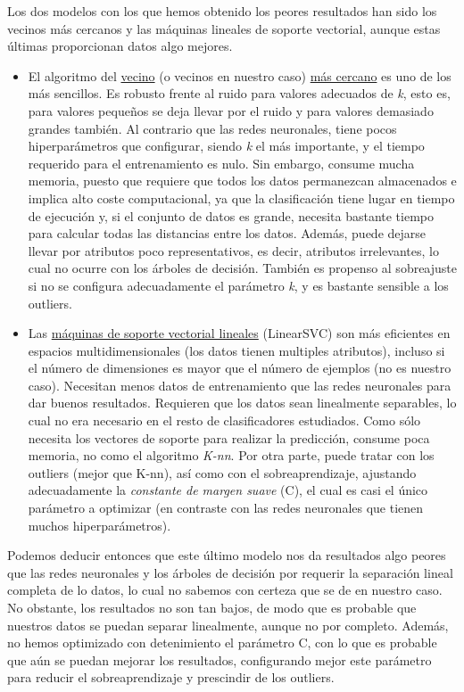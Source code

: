 \documentclass[a4paper,11pt]{article}
\begin{document}
Los dos modelos con los que hemos obtenido los peores resultados han sido los vecinos más cercanos y las máquinas lineales de soporte vectorial, aunque estas últimas proporcionan datos algo mejores.

\begin{itemize}
	\item El algoritmo del \underline{vecino} (o vecinos en nuestro caso) \underline{más cercano} es uno de los más sencillos. Es robusto frente al ruido para valores adecuados de \textit{k}, esto es, para valores pequeños se deja llevar por el ruido y para valores demasiado grandes también. Al contrario que las redes neuronales, tiene pocos hiperparámetros que configurar, siendo \textit{k} el más importante, y el tiempo requerido para el entrenamiento es nulo. Sin embargo, consume mucha memoria, puesto que requiere que todos los datos permanezcan almacenados e implica alto coste computacional, ya que la clasificación tiene lugar en tiempo de ejecución y, si el conjunto de datos es grande, necesita bastante tiempo para calcular todas las distancias entre los datos. Además, puede dejarse llevar por atributos poco representativos, es decir, atributos irrelevantes, lo cual no ocurre con los árboles de decisión. También es propenso al sobreajuste si no se configura adecuadamente el parámetro \textit{k}, y es bastante sensible a los outliers.  

	\item Las \underline{máquinas de soporte vectorial lineales} (LinearSVC) son más eficientes en espacios multidimensionales (los datos tienen multiples atributos), incluso si el número de dimensiones es mayor que el número de ejemplos (no es nuestro caso). Necesitan menos datos de entrenamiento que las redes neuronales para dar buenos resultados. Requieren que los datos sean linealmente separables, lo cual no era necesario en el resto de clasificadores estudiados. Como sólo necesita los vectores de soporte para realizar la predicción, consume poca memoria, no como el algoritmo \textit{K-nn}. Por otra parte, puede tratar con los outliers (mejor que K-nn), así como con el sobreaprendizaje, ajustando adecuadamente la \textit{constante de margen suave} (C), el cual es casi el único parámetro a optimizar (en contraste con las redes neuronales que tienen muchos hiperparámetros).
\end{itemize}

Podemos deducir entonces que este último modelo nos da resultados algo peores que las redes neuronales y los árboles de decisión por requerir la separación lineal completa de lo datos, lo cual no sabemos con certeza que se de en nuestro caso. No obstante, los resultados no son tan bajos, de modo que es probable que nuestros datos se puedan separar linealmente, aunque no por completo. Además, no hemos optimizado con detenimiento el parámetro C, con lo que es probable que aún se puedan mejorar los resultados, configurando mejor este parámetro para reducir el sobreaprendizaje y prescindir de los outliers. 
\end{document}

